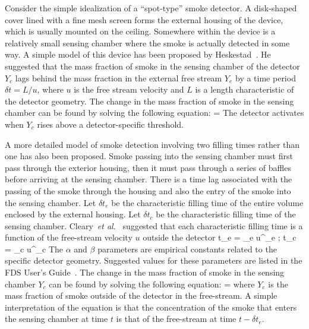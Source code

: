 {Consider the simple idealization of a ``spot-type'' smoke detector. A disk-shaped cover lined with a fine mesh screen
forms the external housing of the device, which is usually mounted on the ceiling.
Somewhere within the device is a relatively small sensing chamber where the smoke is actually detected in some way.
A simple model of this device has been proposed by Heskestad~\cite{SFPE}. He suggested that the mass fraction of smoke in the
sensing chamber of the detector $Y_c$ lags behind the mass fraction in the
external free stream $Y_e$ by a time period $\delta t = L/u$,
where $u$ is the free stream velocity and $L$ is a length characteristic of the detector geometry.
The change in the mass fraction of smoke in the sensing chamber can be found by solving the following equation:
\be {} =  \label{HYoeq} \ee
The detector activates when $Y_c$ rises above a detector-specific threshold.

A more detailed model of smoke detection involving two filling times rather than one has also been proposed.
Smoke passing into the sensing chamber must first pass through the exterior housing, then it must pass through a series
of baffles before arriving at the sensing chamber. There is a time lag
associated with the passing of the smoke through the housing and also the entry of the smoke into the sensing chamber.
Let $\delta t_e$ be the characteristic filling time of the entire volume enclosed by the external housing. Let
$\delta t_c$ be the characteristic filling time of the sensing chamber.
Cleary~{\em et al.}~\cite{Cleary:IAFSS6} suggested that each characteristic filling time is a function of the
free-stream velocity $u$ outside the detector
\be
\delta t_e = \alpha_e u^{\beta_e} \quad ; \quad \delta t_c = \alpha_c u^{\beta_c}
\ee
The $\alpha$ and $\beta$ parameters are empirical constants related to the specific detector geometry.
Suggested values for these parameters are listed in the FDS User's Guide~\cite{FDS_Users_Guide}.
The change in the mass fraction of smoke in the sensing chamber $Y_c$ can be found by solving the following equation:
\be
{} =  \label{Yoeq}
\ee
where $Y_e$ is the mass fraction of smoke outside of the detector in the free-stream.
A simple interpretation of the equation is that the concentration of the smoke that enters the sensing chamber at time $t$
is that of the free-stream at time $t-\delta t_e$.

}
